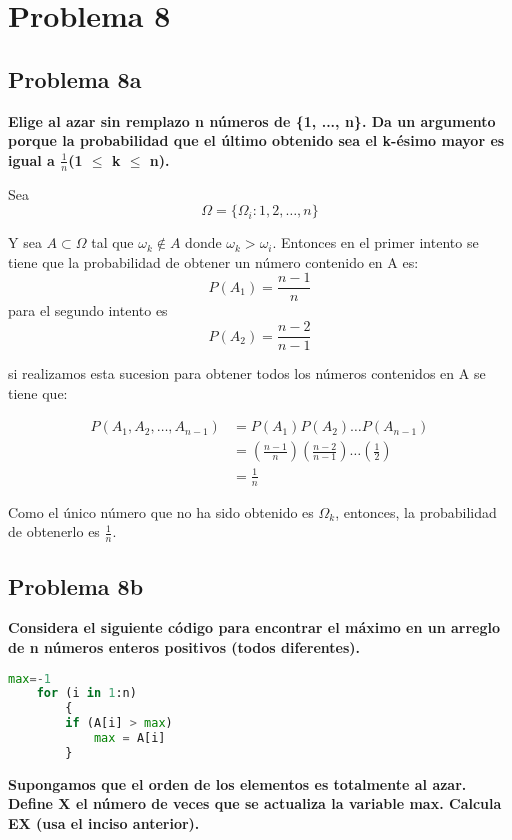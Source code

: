 \section*{Problema 8}
\subsection*{Problema 8a}
\textbf{Elige al azar sin remplazo n números de \{1, ..., n\}. Da un argumento porque la probabilidad que el último obtenido sea el k-ésimo mayor es igual a $\frac{1}{n}$(1 $\leq$ k $\leq$ n).}

Sea
\begin{equation*}
    \Omega = \{ \Omega_i : 1,2,\dots,n \}
\end{equation*}

Y sea $A\subset \Omega$ tal que $\omega_k \notin A$ donde $\omega_k > \omega_i$. Entonces en el primer intento se tiene que la probabilidad de obtener un número contenido en A es:
\begin{equation*}
    P(A_1) = \frac{n-1}{n}
\end{equation*}
para el segundo intento es
\begin{equation*}
    P(A_2) = \frac{n-2}{n-1}
\end{equation*}

si realizamos esta sucesion para obtener todos los números contenidos en A se tiene que:

\begin{align*}
    P(A_1,A_2,\dots,A_{n-1}) & = P(A_1)P(A_2)\dots P(A_{n-1})                                                          \\
                             & = \left(\frac{n-1}{n}\right)\left(\frac{n-2}{n-1}\right) \dots \left(\frac{1}{2}\right) \\
                             & = \frac{1}{n}
\end{align*}


Como el único número que no ha sido obtenido es $\Omega_k$, entonces, la probabilidad de obtenerlo es $\frac{1}{n}$.
\subsection*{Problema 8b}
\textbf{Considera el siguiente código para encontrar el máximo en un arreglo
    de n números enteros positivos (todos diferentes).}
\begin{lstlisting}[language=python]
    max=-1
    for (i in 1:n)
        {
        if (A[i] > max)
            max = A[i]
        }
\end{lstlisting}
\textbf{Supongamos que el orden de los elementos es totalmente al azar. Define X el número de veces que se actualiza la variable max. Calcula EX (usa el inciso anterior).}

